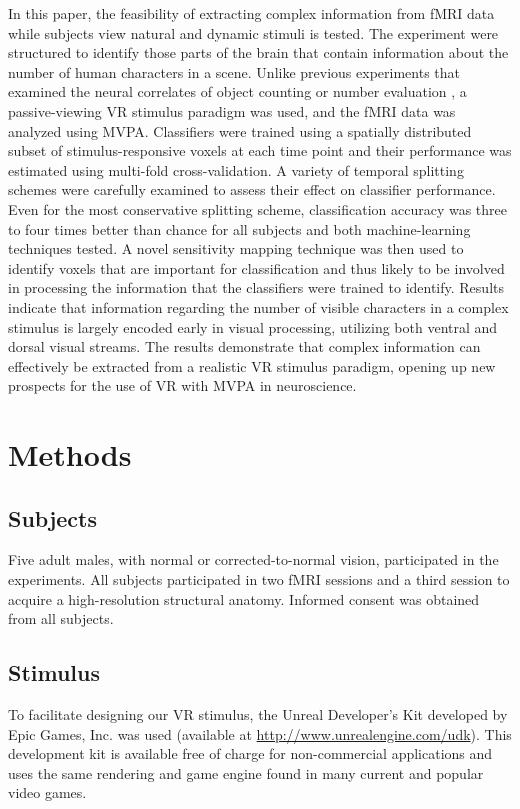 \documentclass[5p,authoryear]{elsarticle}
\begin{document}
In this paper, the feasibility of extracting complex information from fMRI data while subjects view natural and dynamic stimuli is tested.
The experiment were structured to identify those parts of the brain that contain information about the number of human characters in a scene.
Unlike previous experiments that examined the neural correlates of object counting or number evaluation \citep{Dehaene1999,Rickard2000,Barth2006}, a passive-viewing VR stimulus paradigm was used, and the fMRI data was analyzed using MVPA.
Classifiers were trained using a spatially distributed subset of stimulus-responsive voxels at each time point and their performance was estimated using multi-fold cross-validation. 
A variety of temporal splitting schemes were carefully examined to assess their effect on classifier performance.
Even for the most conservative splitting scheme, classification accuracy was three to four times better than chance for all subjects and both machine-learning techniques tested.
A novel sensitivity mapping technique was then used to identify voxels that are important for classification and thus likely to be involved in processing the information that the classifiers were trained to identify.
Results indicate that information regarding  the number of visible characters in a complex stimulus is largely encoded early in visual processing, utilizing both ventral and dorsal visual streams.
The results demonstrate that complex information can effectively be extracted from a realistic VR stimulus paradigm, opening up new prospects for the use of VR with MVPA in neuroscience.

\section{Methods}

\subsection{Subjects}
Five adult males, with normal or corrected-to-normal vision, participated in the experiments. 
All subjects participated in two fMRI sessions and a third session to acquire a high-resolution structural anatomy. 
Informed consent was obtained from all subjects.

\subsection{Stimulus}
To facilitate designing our VR stimulus, the Unreal Developer's Kit developed by Epic Games, Inc. was used (available at \url{http://www.unrealengine.com/udk}).
This development kit is available free of charge for non-commercial applications and uses the same rendering and game engine found in many current and popular video games.
\end{document}
